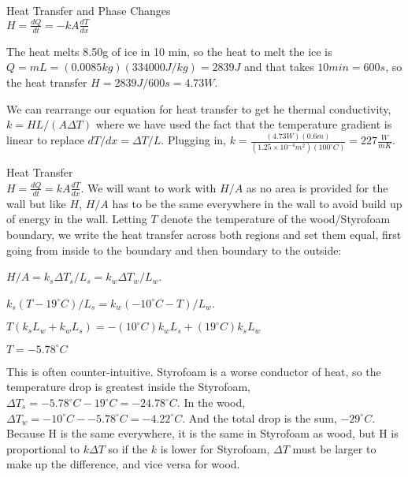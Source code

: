 \documentclass[10pt]{article}
\newenvironment{problem}[2][Problem]{\begin{trivlist}
\item[\hskip \labelsep {\bfseries #1}\hskip \labelsep {\bfseries #2.}]}{\end{trivlist}}
\begin{document}
\begin{problem}{5} Heat Transfer and Phase Changes\\
$H=\frac{dQ}{dt}=-kA\frac{dT}{dx}$
\item The heat melts 8.50g of ice in 10 min, so the heat to melt the ice is $Q=mL=(0.0085kg)(334000J/kg)=2839J$ and that takes $10min=600s$, so the heat transfer $H=2839J/600s=4.73W$.
\item We can rearrange our equation for heat transfer to get he thermal conductivity, $k=HL/(A\Delta T)$ where we have used the fact that the temperature gradient is linear to replace $dT/dx=\Delta T/L$. Plugging in, $k=\frac{(4.73W)(0.6m)}{(1.25\times10^{-4}m^2)(100^\circ C)}=227\frac{W}{mK}.$
\end{problem}



\begin{problem}{6} Heat Transfer\\
$H=\frac{dQ}{dt}=kA\frac{dT}{dx}$. We will want to work with $H/A$ as no area is provided for the wall but like $H$, $H/A$ has to be the same everywhere in the wall to avoid build up of energy in the wall. Letting $T$ denote the temperature of the wood/Styrofoam boundary, we write the heat transfer across both regions and set them equal, first going from inside to the boundary and then boundary to the outside:
\item $H/A=k_s\Delta T_s/L_s = k_w \Delta T_w/L_w$.
\item $k_s(T-19^\circ C)/L_s = k_w(-10^\circ C-T)/L_w$.
\item $T(k_sL_w+k_wL_s)=-(10^\circ C)k_wL_s + (19^\circ C) k_sL_w$
\item $T = -5.78^\circ C$
\item 
This is often counter-intuitive. Styrofoam is a worse conductor of heat, so the temperature drop is greatest inside the Styrofoam, $\Delta T_s = -5.78^\circ C -  19^\circ C=-24.78^\circ C$. In the wood, $\Delta T_w = -10^\circ C -  -5.78^\circ C=-4.22^\circ C$. And the total drop is the sum, $-29^\circ C$. Because H is the same everywhere, it is the same in Styrofoam as wood, but H is proportional to $k\Delta T$ so if the $k$ is lower for Styrofoam, $\Delta T$ must be larger to make up the difference, and vice versa for wood.


\end{problem}








\end{document}

